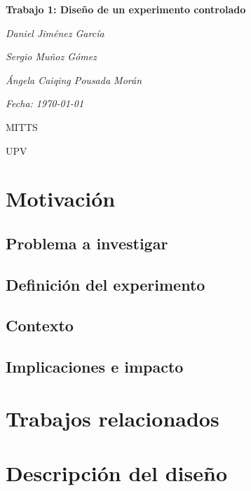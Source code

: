 \documentclass[a4paper,12pt]{report}
\begin{document}
\begin{titlepage}
    \centering
    \vspace*{3cm}
    {\Huge\bfseries Trabajo 1: Diseño de un experimento controlado \par}
    \vspace{2cm}
    {\Large\itshape Daniel Jiménez García \par}
    {\Large\itshape Sergio Muñoz Gómez \par}
    {\Large\itshape Ángela Caiqing Pousada Morán \par}
    \vspace{1cm}
    {\Large\itshape Fecha: \today \par}
    \vfill
    {\large MITTS \par}
    {\large UPV \par}
\end{titlepage}





\chapter{Motivación}

\section{Problema a investigar}

\section{Definición del experimento}

\section{Contexto}

\section{Implicaciones e impacto}


\chapter{Trabajos relacionados}

\chapter{Descripción del diseño}
\end{document}
